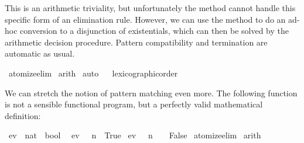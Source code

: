 \begin{isabellebody}
\begin{isamarkuptxt}
  This is an arithmetic triviality, but unfortunately the
   method cannot handle this specific form of an
  elimination rule. However, we can use the method  to do an ad-hoc conversion to a disjunction of
  existentials, which can then be solved by the arithmetic decision procedure.
  Pattern compatibility and termination are automatic as usual.%
\end{isamarkuptxt}%
\isamarkuptrue%
\isamarkupfalse%
\ atomize{}elim\isanewline
{}\isamarkupfalse%
\ arith\isanewline
{}\isamarkupfalse%
\ auto\isanewline
{}\isamarkupfalse%
%
\endisatagproof
{\isafoldproof}%
%
\isadelimproof
%
\endisadelimproof
\isanewline
{}\isamarkupfalse%
%
\isadelimproof
\ %
\endisadelimproof
%
\isatagproof
{}\isamarkupfalse%
\ lexicographic{}order%
\endisatagproof
{\isafoldproof}%
%
\isadelimproof
%
\endisadelimproof
%
\begin{isamarkuptext}%
We can stretch the notion of pattern matching even more. The
  following function is not a sensible functional program, but a
  perfectly valid mathematical definition:%
\end{isamarkuptext}%
\isamarkuptrue%
\isamarkupfalse%
\ ev\ {}{}\ {}nat\ {}\ bool{}\isanewline
{}\isanewline
\ \ {}ev\ {}{}\ {}\ n{}\ {}\ True{}\isanewline
{}\ {}ev\ {}{}\ {}\ n\ {}\ {}{}\ {}\ False{}\isanewline
%
\isadelimproof
%
\endisadelimproof
%
\isatagproof
{}\isamarkupfalse%
\ atomize{}elim\isanewline
{}\isamarkupfalse%
\ arith{}%
\endisatagproof
{\isafoldproof}%
%
\isadelimproof
\isanewline
%
\endisadelimproof

\end{isabellebody}
